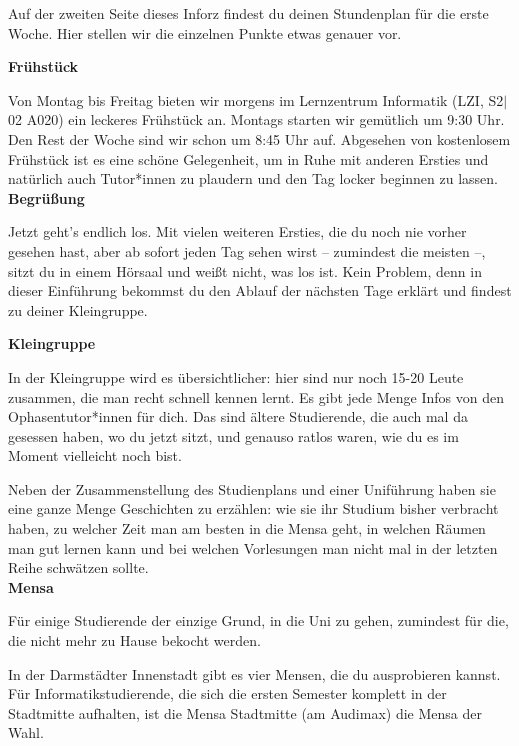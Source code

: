 {Auf der zweiten Seite dieses Inforz findest du deinen Stundenplan für die erste Woche. Hier stellen wir die einzelnen Punkte etwas genauer vor.}
{\textbf{Frühstück}

Von Montag bis Freitag bieten wir morgens im Lernzentrum Informatik (LZI, S2$|$02 A020) ein leckeres Frühstück an. Montags starten wir gemütlich um 9:30 Uhr. Den Rest der Woche sind wir schon um 8:45 Uhr auf.  Abgesehen von kostenlosem Frühstück ist es eine schöne Gelegenheit, um in Ruhe mit anderen Ersties und natürlich auch Tutor*innen zu plaudern und den Tag locker beginnen zu lassen.\\

\noindent\textbf{Begrüßung}

Jetzt geht's endlich los. Mit vielen weiteren Ersties, die du noch nie vorher gesehen hast, aber ab sofort jeden Tag sehen wirst – zumindest die meisten –, sitzt du in einem Hörsaal und weißt nicht, was los ist. Kein Problem, denn in dieser Einführung bekommst du den Ablauf der nächsten Tage erklärt und findest zu deiner Kleingruppe.


\noindent\textbf{Kleingruppe}

In der Kleingruppe wird es übersichtlicher: hier sind nur noch 15-20 Leute zusammen, die man recht schnell kennen lernt. Es gibt jede Menge Infos von den Ophasentutor*innen für dich. Das sind ältere Studierende, die auch mal da gesessen haben, wo du jetzt sitzt, und genauso ratlos waren, wie du es im Moment vielleicht noch bist.

Neben der Zusammenstellung des Studienplans und einer Uniführung haben sie eine ganze Menge Geschichten zu erzählen: wie sie ihr Studium bisher verbracht haben, zu welcher Zeit man am besten in die Mensa geht, in welchen Räumen man gut lernen kann und bei welchen Vorlesungen man nicht mal in der letzten Reihe schwätzen sollte.\\

\noindent\textbf{Mensa}

Für einige Studierende der einzige Grund, in die Uni zu gehen, zumindest für die, die nicht mehr zu Hause bekocht werden.

In der Darmstädter Innenstadt gibt es vier Mensen, die du ausprobieren kannst. Für Informatikstudierende, die sich die ersten Semester komplett in der Stadtmitte aufhalten, ist die Mensa Stadtmitte (am Audimax) die Mensa der Wahl.

}
